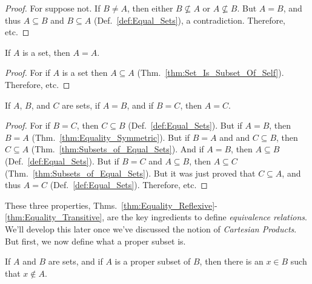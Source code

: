            \begin{proof}
                For suppose not. If $B\ne{A}$, then either
                $B\nsubseteq{A}$ or $A\nsubseteq{B}$.
                But $A=B$, and thus $A\subseteq{B}$  and
                $B\subseteq{A}$ (Def.~\ref{def:Equal_Sets}),
                a contradiction. Therefore, etc.
            \end{proof}
            \begin{theorem}
                \label{thm:Equality_Reflexive}%
                If $A$ is a set, then $A=A$.
            \end{theorem}
            \begin{proof}
                For if $A$ is a set then $A\subseteq{A}$
                (Thm.~\ref{thm:Set_Is_Subset_Of_Self}).
                Therefore, etc.
            \end{proof}
            \begin{theorem}
                \label{thm:Equality_Transitive}%
                If $A$, $B$, and $C$ are sets, if $A=B$, and if
                $B=C$, then $A=C$.
            \end{theorem}
            \begin{proof}
                For if $B=C$, then $C\subseteq{B}$
                (Def.~\ref{def:Equal_Sets}). But if
                $A=B$, then $B=A$
                (Thm.~\ref{thm:Equality_Symmetric}). But if
                $B=A$ and and $C\subseteq{B}$, then
                $C\subseteq{A}$
                (Thm.~\ref{thm:Subsets_of_Equal_Sets}).
                And if $A=B$, then $A\subseteq{B}$
                (Def.~\ref{def:Equal_Sets}). But if $B=C$ and
                $A\subseteq{B}$, then $A\subseteq{C}$
                (Thm.~\ref{thm:Subsets_of_Equal_Sets}). But it
                was just proved that $C\subseteq{A}$, and
                thus $A=C$ (Def.~\ref{def:Equal_Sets}).
                Therefore, etc.
            \end{proof}
            These three properties,
            Thms.~\ref{thm:Equality_Reflexive}-%
            \ref{thm:Equality_Transitive}, are the key ingredients to define
            \textit{equivalence relations}. We'll develop this later once
            we've discussed the notion of \textit{Cartesian Products}.
            But first, we now define what a proper subset is.
            \begin{theorem}
                \label{thm:Prop_Subset_Not_Equal}%
                If $A$ and $B$ are sets, and if $A$ is a proper
                subset of $B$, then there is an $x\in{B}$ such
                that $x\notin{A}$.
            \end{theorem}
